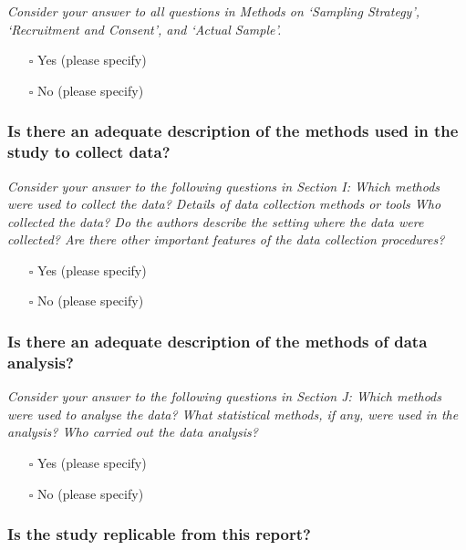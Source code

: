 \documentclass[
  doc, a4paper]{apa7}
\providecommand{\tightlist}{%
  \setlength{\itemsep}{0pt}\setlength{\parskip}{0pt}}
\begin{document}
\emph{Consider your answer to all questions in Methods on `Sampling Strategy', `Recruitment and Consent', and `Actual Sample'.}

\begin{itemize}
\tightlist
\item[$\square$]
  Yes (please specify)
\item[$\square$]
  No (please specify)
\end{itemize}

\subsubsection{Is there an adequate description of the methods used in the study to collect data?}\label{is-there-an-adequate-description-of-the-methods-used-in-the-study-to-collect-data}

\emph{Consider your answer to the following questions in Section I: Which methods were used to collect the data? Details of data collection methods or tools Who collected the data? Do the authors describe the setting where the data were collected? Are there other important features of the data collection procedures?}

\begin{itemize}
\tightlist
\item[$\square$]
  Yes (please specify)
\item[$\square$]
  No (please specify)
\end{itemize}

\subsubsection{Is there an adequate description of the methods of data analysis?}\label{is-there-an-adequate-description-of-the-methods-of-data-analysis}

\emph{Consider your answer to the following questions in Section J: Which methods were used to analyse the data? What statistical methods, if any, were used in the analysis? Who carried out the data analysis?}

\begin{itemize}
\tightlist
\item[$\square$]
  Yes (please specify)
\item[$\square$]
  No (please specify)
\end{itemize}

\subsubsection{Is the study replicable from this report?}\label{is-the-study-replicable-from-this-report}
\end{document}
